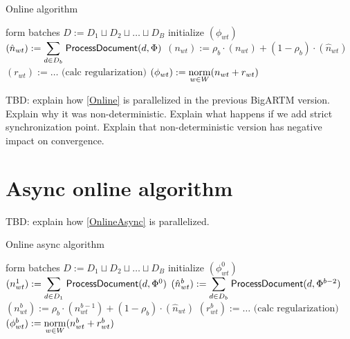 \documentclass[russian,english]{llncs}
\newcommand{\norm}{\mathop{\rm norm}\limits}
\newcommand{\kw}[1]{\textsf{#1}}
\begin{document}


\SetAlgoSkip{}
\begin{algorithm2e}[h]
\caption{Online algorithm} %
\label{alg:Online}
\BlankLine
{}
\BlankLine
form batches $D := D_1 \sqcup D_2 \sqcup \dots \sqcup D_B$\;
initialize $(\phi_{wt})$\;
 {
    $(\hat n_{wt}) := \mathlarger\sum\limits_{d \in D_b} \; \kw{ProcessDocument}(d, \Phi)$\;
    $(n_{wt}) := \rho_b \cdot (n_{wt}) + (1 - \rho_b) \cdot (\hat n_{wt})$\;
    $(r_{wt}) := \dots \text{ (calc regularization)}$\;
    $(\phi_{wt}) := \norm_{w \in W} (n_{wt} + r_{wt})$\;
}
\end{algorithm2e}

TBD: explain how \ref{Online} is parallelized in the previous BigARTM version.
Explain why it was non-deterministic.
Explain what happens if we add strict synchronization point.
Explain that non-deterministic version has negative impact on convergence.

\section{Async online algorithm}
\label{sec:Algorithm}

TBD: explain how \ref{OnlineAsync} is parallelized. 

\SetAlgoSkip{}
\begin{algorithm2e}[h]
\caption{Online async algorithm} %
\label{alg:OnlineAsync}
\BlankLine
{}
\BlankLine
form batches $D := D_1 \sqcup D_2 \sqcup \dots \sqcup D_B$\;
initialize $(\phi^0_{wt})$\;
$(n^1_{wt}) := \mathlarger\sum\limits_{d \in D_1} \; \kw{ProcessDocument}(d, \Phi^0)$\;
 {
    $(\hat n^b_{wt}) := \mathlarger\sum\limits_{d \in D_b} \; \kw{ProcessDocument}(d, \Phi^{b-2})$\;
    $(n^b_{wt}) := \rho_b \cdot (n^{b-1}_{wt}) + (1 - \rho_b) \cdot (\hat n_{wt})$\;
    $(r^b_{wt}) := \dots \text{ (calc regularization)}$\;
    $(\phi^b_{wt}) := \norm_{w \in W} (n^b_{wt} + r^b_{wt})$\;
}
\end{algorithm2e}
\end{document}
